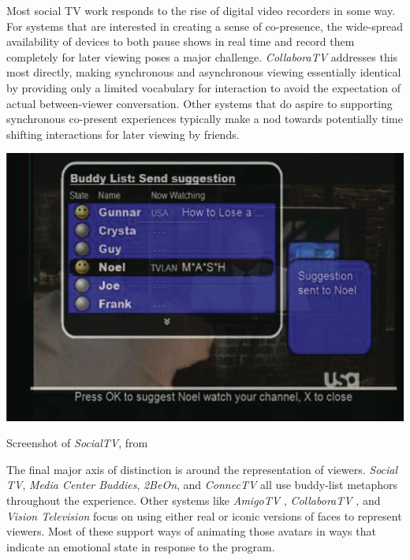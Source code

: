 Most social TV work responds to the rise of digital video recorders in some way. For systems that are interested in creating a sense of co-presence, the wide-spread availability of devices to both pause shows in real time and record them completely for later viewing poses a major challenge. \emph{CollaboraTV} \citep{harrison2007collaboratv} addresses this most directly, making synchronous and asynchronous viewing essentially identical by providing only a limited vocabulary for interaction to avoid the expectation of actual between-viewer conversation. Other systems that do aspire to supporting synchronous co-present experiences typically make a nod towards potentially time shifting interactions for later viewing by friends.

\begin{marginfigure}
	\includegraphics{figures/roar/socialTV.png}
	\caption{Screenshot of \emph{SocialTV}, from \citep{uses.socialTV}}
	\label{fig:socialTV}
\end{marginfigure}


The final major axis of distinction is around the representation of viewers. \emph{Social TV}\citep{harboe2007perceptions}, \emph{Media Center Buddies}\citep{regan2004media}, \emph{2BeOn}\citep{abreu20022beon}, and \emph{ConnecTV} \citep{boertjes2008connectv} all use buddy-list metaphors throughout the experience. Other systems like \emph{AmigoTV} \citep{coppens2004amigotv}, \emph{CollaboraTV} \citep{harrison2007collaboratv}, and \emph{Vision Television}\citep{vt} focus on using either real or iconic versions of faces to represent viewers. Most of these support ways of animating those avatars in ways that indicate an emotional state in response to the program.

